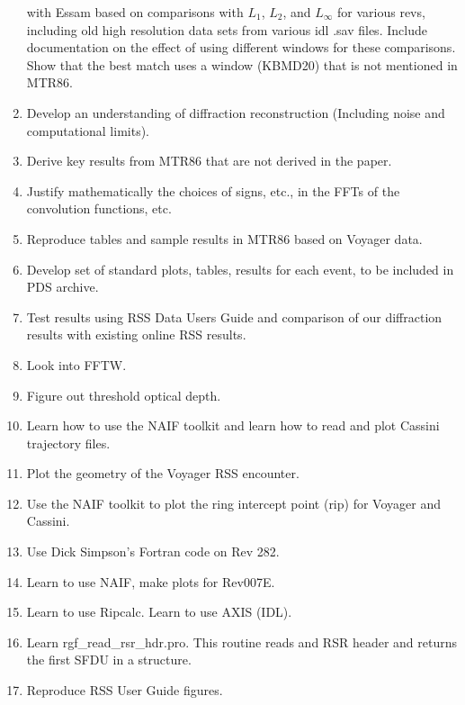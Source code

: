 \documentclass[crop=false,class=article,oneside]{standalone}
\begin{document}
\begin{enumerate}
                  with Essam based on comparisons with $L_{1}$,
                  $L_{2}$, and $L_{\infty}$ for various revs, including
                  old high resolution data sets from various idl .sav
                  files. Include documentation on the effect of using
                  different windows for these comparisons. Show that
                  the best match uses a window (KBMD20) that is not
                  mentioned in MTR86.
            \item Develop an understanding of diffraction
                  reconstruction (Including noise
                  and computational limits).
            \item Derive key results from MTR86 that are not
                  derived in the paper.
            \item Justify mathematically the choices of signs, etc.,
                  in the FFTs of the convolution functions, etc.
            \item Reproduce tables and sample results in MTR86
                  based on Voyager data.
            \item Develop set of standard plots, tables, results
                  for each event, to be included in PDS archive.
            \item Test results using RSS Data Users Guide and
                  comparison of our diffraction results with
                  existing online RSS results.
            \item Look into FFTW.
            \item Figure out threshold optical depth.
            \item Learn how to use the NAIF toolkit and learn
                  how to read and plot Cassini trajectory files.
            \item Plot the geometry of the Voyager RSS encounter.
            \item Use the NAIF toolkit to plot the ring
                  intercept point (rip) for Voyager and Cassini.
            \item Use Dick Simpson's Fortran code on Rev 282.
            \item Learn to use NAIF, make plots for Rev007E.
            \item Learn to use Ripcalc. Learn to use AXIS (IDL).
            \item Learn rgf\_read\_rsr\_hdr.pro. 
                  This routine reads and RSR header and returns
                  the first SFDU in a structure.
            \item Reproduce RSS User Guide figures.

\end{enumerate}
\end{document}
